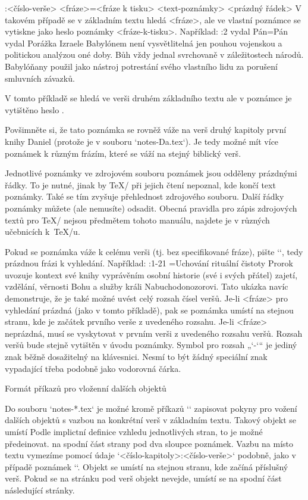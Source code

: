 \begtt
{}:<číslo-verše> {<fráze>}={<fráze k tisku>} <text-poznámky>
<prázdný řádek>
\endtt
V takovém případě se v základním textu hledá <fráze>, ale ve vlastní
poznámce se vytiskne jako heslo poznámky <fráze-k-tisku>. Například:
\begtt
{}:2 {vydal Pán}={Pán vydal} Porážka Izraele Babylónem není vysvětlitelná
   jen pouhou vojenskou a politickou analýzou oné doby. Bůh vždy jednal svrchovaně 
   v záležitostech národů. Babylóňany použil jako nástroj potrestání svého vlastního
   lidu za porušení smluvních závazků.

\endtt
V tomto příkladě se hledá ve verši druhém základního textu  
ale v poznámce je vytištěno heslo .

Povšimněte si, že tato poznámka se rovněž váže na verš druhý kapitoly první
knihy Daniel (protože je v souboru `notes-Da.tex`). Je tedy možné mít více
poznámek k různým frázím, které se váží na stejný biblický verš. 

Jednotlivé poznámky ve zdrojovém souboru poznámek jsou odděleny prázdnými
řádky. To je nutné, jinak by \TeX/ při jejich čtení nepoznal, kde končí text
poznámky. Také se tím zvyšuje přehlednost zdrojového souboru. Další řádky
poznámky můžete (ale nemusíte) odsadit. Obecná pravidla pro zápis
zdrojových textů pro \TeX/ nejsou předmětem tohoto manuálu, najdete je v
různých učebnicích k~\TeX/u.

Pokud se poznámka váže k celému verši (tj. bez specifikované fráze), pište
`{}`, tedy prázdnou frázi k vyhledání. Například:
\begtt
{}:1-21 {}={Uchování rituální čistoty}  Prorok uvozuje kontext své knihy vyprávěním
   osobní historie (své i svých přátel) zajetí, vzdělání, věrnosti Bohu a služby 
   králi Nabuchodonozorovi.
\endtt
Tato ukázka navíc demonstruje, že je také možné uvést celý rozsah čísel veršů.
Je-li <fráze> pro vyhledání prázdná (jako v tomto příkladě), pak se poznámka
umístí na stejnou stranu, kde je začátek prvního verše z uvedeného rozsahu.
Je-li <fráze> neprázdná, musí se vyskytovat v prvním verši z uvedeného
rozsahu veršů. Rozsah veršů bude stejně vytištěn v úvodu poznámky.
Symbol pro rozsah „`-`“ je jediný znak  běžně dosažitelný na
klávesnici. Nesmí to být žádný speciální znak vypadající třeba podobně jako
vodorovná čárka.


\sec[clanky] Formát příkazů pro vloženní dalších objektů

Do souboru `notes-*.tex` je možné kromě příkazů `\Note` zapisovat pokyny pro
vožení dalších objektů s vazbou na konkrétní verš v základním textu. Takový
objekt se umístí\fnote
{Podle implictní definice vzhledu jednotlivých stran, to je možné
předeinovat.}
na spodní část strany pod dva sloupce poznámek. Vazbu na místo textu
vymezíme pomocí údaje `<číslo-kapitoly>:<číslo-verše>` podobně,
jako v případě poznámek
`\Note`. Objekt se umístí na stejnou stranu, kde začíná příslušný verš.
Pokud se na stránku pod verš objekt nevejde, umístí se na spodní část
následující stránky.


